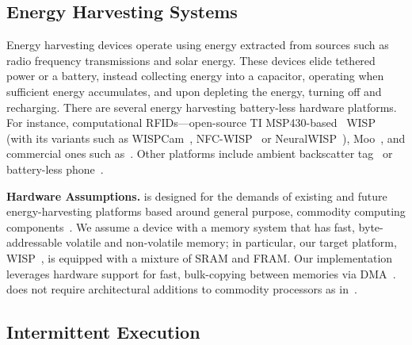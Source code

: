 \subsection{Energy Harvesting Systems}
\label{sec:background_harvesting}

Energy harvesting devices operate using energy extracted from sources such as
radio frequency transmissions and solar energy. These devices elide tethered
power or a battery, instead collecting energy into a capacitor, operating when
sufficient energy accumulates, and upon depleting the energy, turning off and
recharging.
There are several energy harvesting battery-less hardware platforms. For
instance, computational RFIDs---open-source TI MSP430-based~\cite{wolverine}
WISP~\cite{wisp5} (with its variants such as
WISPCam~\cite{naderiparizi_rfid_2015}, NFC-WISP~\cite{zhao_rfid_2015} or
NeuralWISP~\cite{holleman_biocas_2008}), Moo~\cite{moo}, and commercial ones
such as~\cite{medusa_farsens_2017}. Other platforms include ambient backscatter
tag~\cite{liu_sigcomm_2013,parks_sigcomm_2014} or battery-less
phone~\cite{talla_imwut_2017}. 

\textbf{Hardware Assumptions.} \sys is designed for the demands of existing and
future energy-harvesting platforms based around general purpose, commodity
computing components~\cite{wisp,msp430datasheet}. We assume a device with a
memory system that has fast, byte-addressable volatile and non-volatile memory;
in particular, our target platform, WISP~\cite{wisp}, is equipped with a
mixture of SRAM and FRAM. Our implementation leverages hardware support for
fast, bulk-copying between memories via DMA~\cite{msp430datasheet}. \sys does not
require architectural additions to commodity processors as
in~\cite{su_date_2017,hicks_isca_2017,quickrecall,nvp}.

\subsection{Intermittent Execution}
\label{sec:background_consistency}

